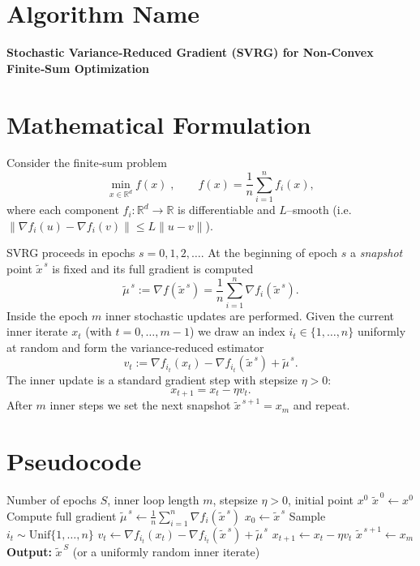 \documentclass[11pt]{article}
\newcommand{\RR}{\mathbb{R}}
\newcommand{\grad}{\nabla}
\begin{document}
\section*{Algorithm Name}
\textbf{Stochastic Variance‑Reduced Gradient (SVRG) for Non‑Convex Finite‑Sum Optimization}

\section*{Mathematical Formulation}
Consider the finite‑sum problem  
\[
\min_{x\in\RR^{d}} f(x)\;,\qquad 
f(x)=\frac{1}{n}\sum_{i=1}^{n} f_i(x),
\]
where each component $f_i:\RR^{d}\!\to\!\RR$ is differentiable and $L$–smooth (i.e. $\|\grad f_i(u)-\grad f_i(v)\|\le L\|u-v\|$).

SVRG proceeds in epochs $s=0,1,2,\dots$.  
At the beginning of epoch $s$ a \emph{snapshot} point $\tilde{x}^{\,s}$ is fixed and its full gradient is computed
\[
\tilde{\mu}^{\,s}:=\grad f(\tilde{x}^{\,s})=\frac1n\sum_{i=1}^{n}\grad f_i(\tilde{x}^{\,s}).
\]
Inside the epoch $m$ inner stochastic updates are performed.  
Given the current inner iterate $x_t$ (with $t=0,\dots,m-1$) we draw an index $i_t\in\{1,\dots,n\}$ uniformly at random and form the variance‑reduced estimator
\[
v_t:=\grad f_{i_t}(x_t)-\grad f_{i_t}(\tilde{x}^{\,s})+\tilde{\mu}^{\,s}.
\]
The inner update is a standard gradient step with stepsize $\eta>0$:
\[
x_{t+1}=x_t-\eta v_t .
\]
After $m$ inner steps we set the next snapshot $\tilde{x}^{\,s+1}=x_m$ and repeat.

\section*{Pseudocode}
\begin{algorithm}[H]
\caption{SVRG (non‑convex, double‑loop)}\label{alg:svrg}
\begin{algorithmic}[1]
\Require Number of epochs $S$, inner loop length $m$, stepsize $\eta>0$, initial point $x^{0}$
\State $\tilde{x}^{\,0}\gets x^{0}$
    \State Compute full gradient $\displaystyle \tilde{\mu}^{\,s}\gets\frac1n\sum_{i=1}^{n}\grad f_i(\tilde{x}^{\,s})$
    \State $x_0\gets\tilde{x}^{\,s}$
        \State Sample $i_t\sim\text{Unif}\{1,\dots,n\}$
        \State $v_t\gets\grad f_{i_t}(x_t)-\grad f_{i_t}(\tilde{x}^{\,s})+\tilde{\mu}^{\,s}$
        \State $x_{t+1}\gets x_t-\eta v_t$
    \EndFor
    \State $\tilde{x}^{\,s+1}\gets x_m$
\EndFor
\State \textbf{Output:} $\tilde{x}^{\,S}$ (or a uniformly random inner iterate)
\end{algorithmic}
\end{algorithm}
\end{document}
